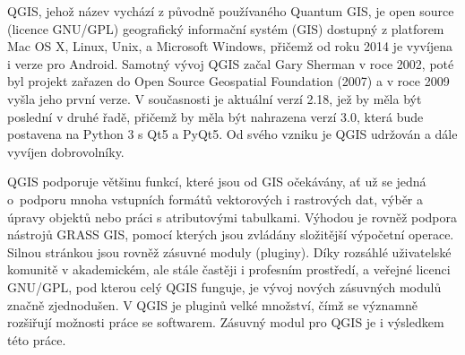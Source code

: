 QGIS, jehož název vychází z původně používaného Quantum GIS, je open
source (licence GNU/GPL) geografický informační systém (GIS) dostupný
z platforem Mac OS X, Linux, Unix, a Microsoft Windows, přičemž od
roku 2014 je vyvíjena i verze pro Android. Samotný vývoj QGIS začal
Gary Sherman v roce 2002, poté byl projekt zařazen do Open Source
Geospatial Foundation (2007) a v roce 2009 vyšla jeho první verze. V
současnosti je aktuální verzí 2.18, jež by měla být poslední v druhé
řadě, přičemž by měla být nahrazena verzí 3.0, která bude postavena na
Python 3 s Qt5 a PyQt5. Od svého vzniku je QGIS udržován a dále
vyvíjen dobrovolníky.

QGIS podporuje většinu funkcí, které jsou od GIS očekávány, ať už se
jedná o~podporu mnoha vstupních formátů vektorových i rastrových dat,
výběr a úpravy objektů nebo práci s atributovými tabulkami. Výhodou je
rovněž podpora nástrojů GRASS GIS, pomocí kterých jsou zvládány
složitější výpočetní operace.  Silnou stránkou jsou rovněž zásuvné
moduly (pluginy). Díky rozsáhlé uživatelské komunitě v akademickém,
ale stále častěji i profesním prostředí, a veřejné licenci GNU/GPL,
pod kterou celý QGIS funguje, je vývoj nových zásuvných modulů značně
zjednodušen. V QGIS je pluginů velké množství, čímž se významně
rozšiřují možnosti práce se softwarem. Zásuvný modul pro QGIS je i
výsledkem této práce.\cite{masteringQgis}
